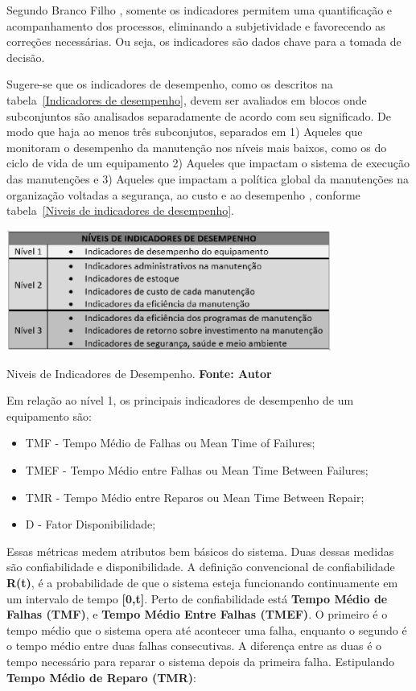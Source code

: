 Segundo Branco Filho \cite{branco2006indicadores}, somente os indicadores permitem uma quantificação e acompanhamento dos processos, eliminando a subjetividade e favorecendo as correções necessárias. Ou seja, os indicadores são dados chave para a tomada de decisão.

Sugere-se que os indicadores de desempenho, como os descritos na tabela~\ref{Indicadores de desempenho}, devem ser avaliados em blocos onde subconjuntos são analisados separadamente de acordo com seu significado. De modo que haja ao menos três subconjutos, separados em 1) Aqueles que monitoram o desempenho da manutenção nos níveis mais baixos, como os do ciclo de vida de um equipamento 2) Aqueles que impactam o sistema de execução das manutenções e 3) Aqueles que impactam a política global da manutenções na organização voltadas a segurança, ao custo e ao desempenho \cite{de2012indicadores}, conforme tabela~\ref{Niveis de indicadores de desempenho}.

\graphicspath{{figuras/}}
\begin{table}[h]
\centering
\includegraphics[width=0.8\textwidth]{niveisdeindicadores.eps}
\caption{Niveis de Indicadores de Desempenho. \textbf{Fonte: Autor}}
\label{Niveis de indicadores de desempenho}
\end{table}

Em relação ao nível 1, os principais indicadores de desempenho de um equipamento são:
\begin{itemize}
	\item TMF - Tempo Médio de Falhas ou Mean Time of Failures;
	\item TMEF - Tempo Médio entre Falhas ou Mean Time Between Failures;
	\item TMR - Tempo Médio entre Reparos ou Mean Time Between Repair;
	\item D - Fator Disponibilidade;
	\end{itemize}

Essas métricas medem atributos bem básicos do sistema. Duas dessas medidas são confiabilidade e disponibilidade. A definição convencional de confiabilidade \textbf{R(t)}, é a probabilidade de que o sistema esteja funcionando continuamente em um intervalo de tempo \textbf{[0,t]}.
Perto de confiabilidade está \textbf{Tempo Médio de Falhas (TMF)},  e \textbf{Tempo Médio Entre Falhas (TMEF)}. O primeiro é o tempo médio que o sistema opera até acontecer uma falha, enquanto o segundo é o tempo médio entre duas falhas consecutivas. A diferença entre as duas  é o tempo necessário para reparar o sistema depois da primeira falha. Estipulando \textbf{Tempo Médio de Reparo (TMR)}:

